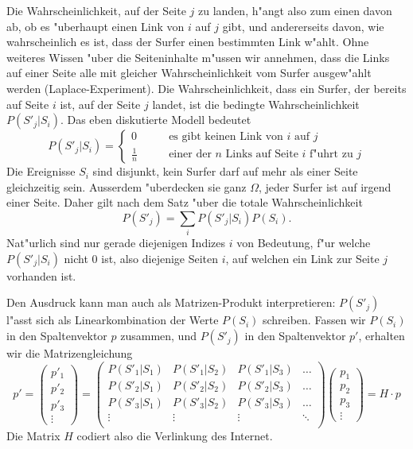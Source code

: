 Die Wahrscheinlichkeit, auf der Seite $j$ zu landen,
h"angt also zum einen davon ab, ob es "uberhaupt
einen Link von $i$ auf $j$ gibt, und andererseits davon, wie wahrscheinlich
es ist, dass der Surfer einen bestimmten Link w"ahlt.
Ohne weiteres Wissen "uber die Seiteninhalte m"ussen wir
annehmen, dass die Links auf einer Seite alle mit gleicher Wahrscheinlichkeit
vom Surfer ausgew"ahlt werden (Laplace-Experiment).
Die Wahrscheinlichkeit, dass ein Surfer, der bereits
auf Seite $i$ ist, auf der Seite $j$ landet, ist die bedingte Wahrscheinlichkeit
$P(S'_j|S_i)$.
Das eben diskutierte Modell bedeutet
\[
P(S'_j|S_i)=\begin{cases}
0&\qquad\text{es gibt keinen Link von $i$ auf $j$}\\
\displaystyle\frac1n&\qquad\text{einer der $n$ Links auf Seite $i$ f"uhrt zu $j$}
\end{cases}
\]
Die Ereignisse $S_i$ sind disjunkt, kein Surfer darf auf mehr als einer
Seite gleichzeitig sein.
Ausserdem "uberdecken sie ganz $\Omega$, jeder Surfer ist auf irgend einer
Seite.
Daher gilt nach dem Satz "uber die totale Wahrscheinlichkeit
\[
P(S'_j)=\sum_{i}P(S'_j|S_i)P(S_i).
\]
Nat"urlich sind nur gerade diejenigen Indizes $i$ von Bedeutung, f"ur welche $P(S'_j|S_i)$
nicht $0$ ist, also diejenige Seiten $i$, auf welchen ein Link zur Seite $j$
vorhanden ist.

Den Ausdruck kann man auch als Matrizen-Produkt interpretieren: $P(S'_j)$ l"asst sich
als Linearkombination der Werte $P(S_i)$ schreiben.
Fassen wir $P(S_i)$ in den Spaltenvektor
$p$ zusammen, und $P(S'_j)$ in den Spaltenvektor $p'$, erhalten wir die Matrizengleichung
\[
p'=
\left(\begin{matrix}p'_1\\p'_2\\p'_3\\\vdots\end{matrix}\right)
=
\left(\begin{matrix}
P(S'_1|S_1)&P(S'_1|S_2)&P(S'_1|S_3)&\dots\\
P(S'_2|S_1)&P(S'_2|S_2)&P(S'_2|S_3)&\dots\\
P(S'_3|S_1)&P(S'_3|S_2)&P(S'_3|S_3)&\dots\\
\vdots&\vdots&\vdots&\ddots\\
\end{matrix}\right)
\left(\begin{matrix}p_1\\p_2\\p_3\\\vdots\end{matrix}\right)
=
H\cdot p
\]
Die Matrix $H$ codiert also die Verlinkung des Internet.

